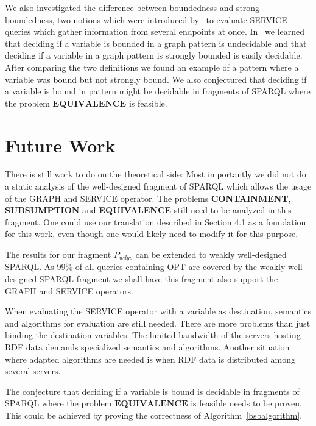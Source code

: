 \documentclass[draft,final]{vutinfth} %
\begin{document}
We also investigated the difference between boundedness and strong boundedness,
two notions which were introduced by~\cite{BuilAranda20131}  
to evaluate SERVICE queries which gather information from several endpoints at
once. In~\cite{BuilAranda20131} we learned that deciding if a variable is
bounded in a graph pattern is undecidable and that deciding if a variable in a graph
pattern is strongly bounded is easily decidable. After comparing the two
definitions we found an example of a pattern where a variable was bound but not
strongly bound. We also conjectured that deciding if a variable is bound in
pattern might be decidable in fragments of SPARQL where the problem 
$\textbf{EQUIVALENCE}$ is feasible.

\section{Future Work}
There is still work to do on the theoretical side:
Most importantly we did not do a static analysis of the well-designed fragment of SPARQL
which allows the usage of the GRAPH and SERVICE operator. The problems \textbf{CONTAINMENT},
\textbf{SUBSUMPTION} and \textbf{EQUIVALENCE} still need to be analyzed in this
fragment. One could use our translation described in Section 4.1 as a foundation
for this work, even though one would likely need to modify it for this purpose.

The results for our fragment
$P_{wdgs}$ can be extended to weakly well-designed SPARQL. As 99\% of all queries containing OPT
are covered by the weakly-well designed SPARQL fragment we shall
have this fragment also support the GRAPH and SERVICE operators. 

When evaluating the SERVICE operator with a variable as destination,
semantics and algorithms for evaluation are still needed. There are more
problems than just binding the destination variables: The limited bandwidth of the
servers hosting RDF data demands specialized semantics and algorithms. Another
situation where adapted algorithms are needed is when RDF data is distributed
among several servers.

The conjecture that deciding if a variable is bound is decidable
in fragments of SPARQL where the problem $\textbf{EQUIVALENCE}$ is feasible
needs to be proven. This could be achieved by proving the correctness of
Algorithm~\ref{bsbalgorithm}.



\backmatter

\listoffigures %
\end{document}

